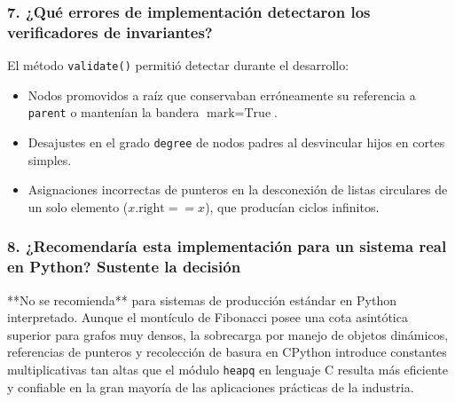 \subsubsection*{7. ¿Qué errores de implementación detectaron los verificadores de invariantes?}
El método \texttt{validate()} permitió detectar durante el desarrollo:
\begin{itemize}
    \item Nodos promovidos a raíz que conservaban erróneamente su referencia a \texttt{parent} o mantenían la bandera $\text{mark} = \text{True}$.
    \item Desajustes en el grado \texttt{degree} de nodos padres al desvincular hijos en cortes simples.
    \item Asignaciones incorrectas de punteros en la desconexión de listas circulares de un solo elemento ($x.\text{right} == x$), que producían ciclos infinitos.
\end{itemize}

\subsubsection*{8. ¿Recomendaría esta implementación para un sistema real en Python? Sustente la decisión}
**No se recomienda** para sistemas de producción estándar en Python interpretado. Aunque el montículo de Fibonacci posee una cota asintótica superior para grafos muy densos, la sobrecarga por manejo de objetos dinámicos, referencias de punteros y recolección de basura en CPython introduce constantes multiplicativas tan altas que el módulo \texttt{heapq} en lenguaje C resulta más eficiente y confiable en la gran mayoría de las aplicaciones prácticas de la industria.
